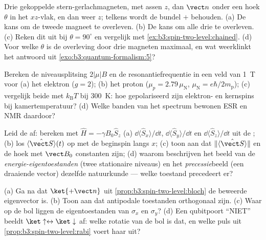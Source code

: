 \begin{exercise}[$\star$]\label{exo:b3:spin-two-level:3}
Drie gekoppelde stern-gerlachmagneten, met assen $z$, dan $\vect n$ onder
een hoek $\theta$ in het $xz$-vlak, en dan weer $z$; telkens wordt de
bundel $+$ behouden. (a) De kans om de tweede magneet te overleven. (b) De
kans om alle drie te overleven. (c) Reken dit uit bij $\theta = 90^\circ$
en vergelijk met \cref{ex:b3:spin-two-level:chained}. (d) Voor welke
$\theta$ is de overleving door drie magneten maximaal, en wat weerklinkt
het antwoord uit \cref{exo:b3:quantum-formalism:5}?
\end{exercise}

\begin{exercise}[$\star$]\label{exo:b3:spin-two-level:4}
Bereken de niveausplitsing $2|\mu|B$ en de resonantiefrequentie in een
veld van \qty{1}{T} voor (a) het elektron ($g = 2$); (b) het proton
($\mu_p = 2.79\,\mu_{\text{N}}$, $\mu_{\text{N}} =
e\hbar/2m_{\text{p}}$);
(c) vergelijk beide met $k_{\text{B}}T$ bij \qty{300}{K}: hoe
gepolariseerd zijn elektron- en kernspins bij kamertemperatuur? (d) Welke
banden van het spectrum bewonen ESR en NMR daardoor?
\end{exercise}

\begin{exercise}[$\star\star$]\label{exo:b3:spin-two-level:5}
Leid de  af: bereken met $\hat H = -\gamma B_0\hat S_z$ (a)
$\dd\langle\hat S_x\rangle/\dd t$, $\dd\langle\hat
S_y\rangle/\dd t$ en
$\dd\langle\hat S_z\rangle/\dd t$ uit de ; (b) los
$\langle\hat{\vect S}\rangle(t)$ op met de beginspin langs $x$; (c) toon
aan dat $\|\langle\hat{\vect S}\rangle\|$ en de hoek met $\vect B_0$
constanten zijn; (d) waarom beschrijven het beeld van de
\emph{energie-eigentoestanden} (twee stationaire niveaus) en het
\emph{precessie}beeld (een draaiende vector) dezelfde natuurkunde ---
welke toestand precedeert er?
\end{exercise}

\begin{exercise}[$\star\star$]\label{exo:b3:spin-two-level:6}
(a) Ga na dat $\ket{+\vect n}$ uit
\cref{prop:b3:spin-two-level:bloch} de beweerde eigenvector is. (b)
Toon aan dat antipodale toestanden orthogonaal zijn. (c) Waar op de bol
liggen de eigentoestanden van $\sigma_x$ en $\sigma_y$? (d) Een
qubitpoort ``NIET'' beeldt $\ket\uparrow \leftrightarrow \ket\downarrow$
af: welke rotatie van de bol is dat, en welke puls uit
\cref{prop:b3:spin-two-level:rabi} voert haar uit?
\end{exercise}

